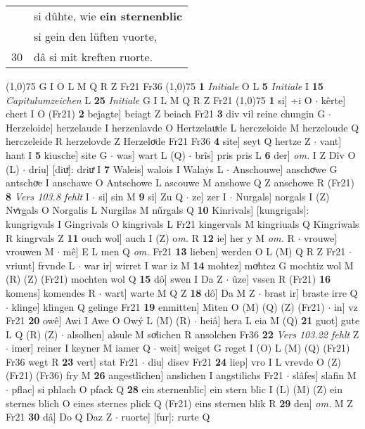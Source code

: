 \documentclass[8pt,a4paper,notitlepage]{article}
\begin{document}
\begin{table}[ht]
\begin{minipage}[t]{0.5\linewidth}
\begin{tabular}{rl}
 & si dûhte, wie \textbf{ein sternenblic}\\ 
 & si gein den lüften vuorte,\\ 
30 & dâ si mit kreften ruorte.\\ 
\end{tabular}
\scriptsize
\line(1,0){75} \newline
G I O L M Q R Z Fr21 Fr36 \newline
\line(1,0){75} \newline
\textbf{1} \textit{Initiale} O L  \textbf{5} \textit{Initiale} I  \textbf{15} \textit{Capitulumzeichen} L  \textbf{25} \textit{Initiale} G I L M Q R Z Fr21  \newline
\line(1,0){75} \newline
\textbf{1} si] ÷i O  $\cdot$ kêrte] chert I O (Fr21) \textbf{2} bejagte] beiagt Z beiach Fr21 \textbf{3} div vil reine chungin G  $\cdot$ Herzeloide] herzelaude I herzenlavde O Hertzelauͯde L herczeloide M herzeloude Q herczeleide R herzelovde Z Herzeloͮde Fr21 Fr36 \textbf{4} site] seyt Q hertze Z  $\cdot$ vant] hant I \textbf{5} kiusche] site G  $\cdot$ was] wart L (Q)  $\cdot$ brîs] pris pris L \textbf{6} der] \textit{om.} I Z Dîv O (L)  $\cdot$ driu] [diuͤ]: driuͤ I \textbf{7} Waleis] walois I Walaẏs L  $\cdot$ Anschouwe] anschoͮwe G antschoͮe I anschawe O Antschowe L ascouwe M anshowe Q Z anschowe R (Fr21) \textbf{8} \textit{Vers 103.8 fehlt} I   $\cdot$ si] sin M \textbf{9} si] Zu Q  $\cdot$ ze] zer I  $\cdot$ Nurgals] norgals I (Z) Nvͦrgals O Norgalis L Nurgilas M nűrgals Q \textbf{10} Kinrivals] [kungrigals]: kungrigvals I Gingrivals O kingrivals L Fr21 kingervals M kingriuals Q Kingriwals R kingrvals Z \textbf{11} ouch wol] auch I (Z) o\textit{m. } R \textbf{12} ie] her y M \textit{om.} R  $\cdot$ vrouwe] vrouwen M  $\cdot$ mê] E L men Q \textit{om.} Fr21 \textbf{13} lieben] werden O L (M) Q R Z Fr21  $\cdot$ vriunt] frvnde L  $\cdot$ war ir] wirret I war iz M \textbf{14} mohtez] moͮhtez G mochtiz wol M (R) (Z) (Fr21) mochten wol Q \textbf{15} dô] swen I Da Z  $\cdot$ ûze] vssen R (Fr21) \textbf{16} komens] komendes R  $\cdot$ wart] warte M Q Z \textbf{18} dô] Da M Z  $\cdot$ brast ir] braste irre Q  $\cdot$ klinge] klingen Q gelinge Fr21 \textbf{19} enmitten] Miten O (M) (Q) (Z) (Fr21)  $\cdot$ in] vz Fr21 \textbf{20} owê] Awi I Awe O Owý L (M) (R)  $\cdot$ heiâ] hera L eia M (Q) \textbf{21} guot] gute L Q (R) (Z)  $\cdot$ alsolhen] alsule M soͯlichen R ansolchen Fr36 \textbf{22} \textit{Vers 103.22 fehlt} Z   $\cdot$ imer] reiner I keyner M iamer Q  $\cdot$ weit] weiget G reget I (O) L (M) (Q) (Fr21) Fr36 wegt R \textbf{23} vert] stat Fr21  $\cdot$ diu] disev Fr21 \textbf{24} liep] vro I L vrevde O (Z) (Fr21) (Fr36) fry M \textbf{26} angestlîchen] anslichen I angstilichs Fr21  $\cdot$ slâfes] slafin M  $\cdot$ pflac] si phlach O pfack Q \textbf{28} ein sternenblic] ein stern blic I (L) (M) (Z) ein sternes blich O eines sternes plick Q (Fr21) eins sternen blik R \textbf{29} den] \textit{om.} M Z Fr21 \textbf{30} dâ] Do Q Daz Z  $\cdot$ ruorte] [fur]: rurte Q \newline

\end{minipage}
\end{table}
\end{document}
